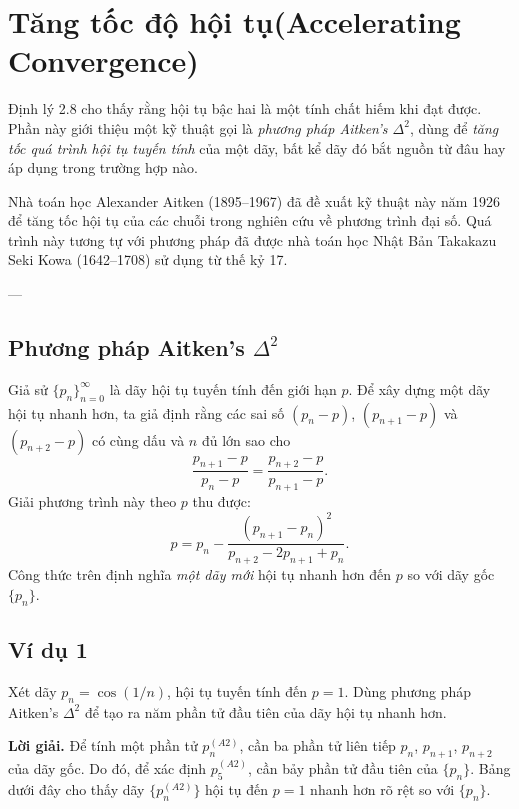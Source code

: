 \section{Tăng tốc độ hội tụ(Accelerating Convergence)}

Định lý 2.8 cho thấy rằng hội tụ bậc hai là một tính chất hiếm khi đạt được. 
Phần này giới thiệu một kỹ thuật gọi là \textit{phương pháp Aitken’s $\Delta^2$}, 
dùng để \textit{tăng tốc quá trình hội tụ tuyến tính} của một dãy, 
bất kể dãy đó bắt nguồn từ đâu hay áp dụng trong trường hợp nào.

Nhà toán học Alexander Aitken (1895–1967) đã đề xuất kỹ thuật này năm 1926 
để tăng tốc hội tụ của các chuỗi trong nghiên cứu về phương trình đại số. 
Quá trình này tương tự với phương pháp đã được nhà toán học Nhật Bản 
Takakazu Seki Kowa (1642–1708) sử dụng từ thế kỷ 17.

---

\subsection*{\textbf{Phương pháp Aitken’s $\Delta^2$}}

Giả sử $\{p_n\}_{n=0}^\infty$ là dãy hội tụ tuyến tính đến giới hạn $p$.  
Để xây dựng một dãy hội tụ nhanh hơn, ta giả định rằng các sai số 
$(p_n - p)$, $(p_{n+1} - p)$ và $(p_{n+2} - p)$ có cùng dấu 
và $n$ đủ lớn sao cho
\[
\frac{p_{n+1} - p}{p_n - p} 
= \frac{p_{n+2} - p}{p_{n+1} - p}.
\]
Giải phương trình này theo $p$ thu được:
\[
p = p_n - \frac{(p_{n+1} - p_n)^2}{p_{n+2} - 2p_{n+1} + p_n}.
\]
Công thức trên định nghĩa \textit{một dãy mới} hội tụ nhanh hơn đến $p$ 
so với dãy gốc $\{p_n\}$.

\subsection*{Ví dụ 1}

Xét dãy $p_n = \cos(1/n)$, hội tụ tuyến tính đến $p = 1$.  
Dùng phương pháp Aitken’s $\Delta^2$ để tạo ra năm phần tử đầu tiên của dãy hội tụ nhanh hơn.

\textbf{Lời giải.}  
Để tính một phần tử $p_n^{(A2)}$, cần ba phần tử liên tiếp $p_n$, $p_{n+1}$, $p_{n+2}$ của dãy gốc.  
Do đó, để xác định $p_5^{(A2)}$, cần bảy phần tử đầu tiên của $\{p_n\}$.  
Bảng dưới đây cho thấy dãy $\{p_n^{(A2)}\}$ hội tụ đến $p = 1$ nhanh hơn rõ rệt so với $\{p_n\}$.

